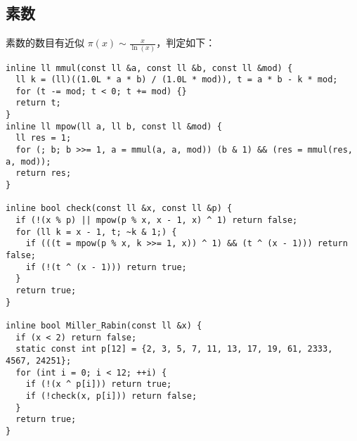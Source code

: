 \subsection{素数}
素数的数目有近似 $\pi(x) \sim \frac{x}{\ln(x)}$，判定如下：
\begin{lstlisting}
inline ll mmul(const ll &a, const ll &b, const ll &mod) {
  ll k = (ll)((1.0L * a * b) / (1.0L * mod)), t = a * b - k * mod;
  for (t -= mod; t < 0; t += mod) {}
  return t;
}
inline ll mpow(ll a, ll b, const ll &mod) {
  ll res = 1;
  for (; b; b >>= 1, a = mmul(a, a, mod)) (b & 1) && (res = mmul(res, a, mod));
  return res;
}

inline bool check(const ll &x, const ll &p) {
  if (!(x % p) || mpow(p % x, x - 1, x) ^ 1) return false;
  for (ll k = x - 1, t; ~k & 1;) {
    if (((t = mpow(p % x, k >>= 1, x)) ^ 1) && (t ^ (x - 1))) return false;
    if (!(t ^ (x - 1))) return true;
  }
  return true;
}

inline bool Miller_Rabin(const ll &x) {
  if (x < 2) return false;
  static const int p[12] = {2, 3, 5, 7, 11, 13, 17, 19, 61, 2333, 4567, 24251};
  for (int i = 0; i < 12; ++i) {
    if (!(x ^ p[i])) return true;
    if (!check(x, p[i])) return false;
  }
  return true;
}
\end{lstlisting}
